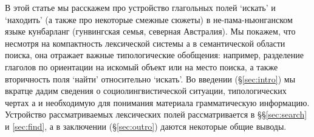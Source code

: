 
В этой статье мы расскажем про устройство глагольных полей `искать' и `находить' (а также про некоторые смежные сюжеты) в не-пама-ньюнганском языке кунбарланг (гунвингская семья, северная Австралия). Мы покажем, что несмотря на компактность лексической системы  а в семантической области поиска, она отражает важные типологические обобщения: например, разделение глаголов по ориентации на искомый объект или на место поиска, а также вторичность поля `найти' относительно `искать'. Во введении (\S\ref{sec:intro}) мы вкратце дадим сведения о социолингвистической ситуации, типологических чертах  а и необходимую для понимания материала грамматическую информацию. Устройство рассматриваемых лексических полей рассматривается в \S\S\ref{sec:search} и \ref{sec:find}, а в заключении (\S\ref{sec:outro}) даются некоторые общие выводы.

